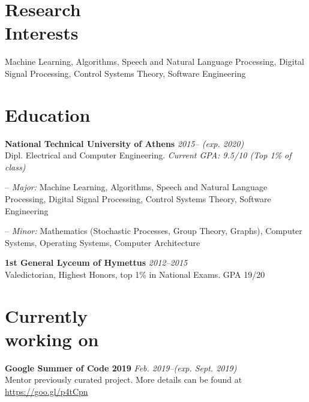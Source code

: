 \documentclass[margin]{res}
\newcommand{\field}[2]{\noindent \textbf{#1} \hfill #2 \\}
\begin{document}
\begin{resume}



\section{Research \\ Interests} Machine Learning, Algorithms, Speech and Natural Language Processing, Digital Signal Processing, Control Systems Theory, Software Engineering

\section{Education}
\textbf{National Technical University of Athens} \hfill \emph{2015-- (exp. 2020)} \\
Dipl. Electrical and Computer Engineering.  \hfill \emph{Current GPA: 9.5/10 (Top 1\% of class)} \\ 
\begin{compactitem}
\item[--] \emph{Major:} Machine Learning, Algorithms, Speech and Natural Language Processing, Digital Signal Processing, Control Systems Theory, Software Engineering \\
\item[--] \emph{Minor:} Mathematics (Stochastic Processes, Group Theory, Graphs), Computer Systems, Operating Systems, Computer Architecture 
\end{compactitem}


\textbf{1st General Lyceum of Hymettus} \hfill \emph{2012--2015} 
\\ Valedictorian, Highest Honors, top 1\% in National Exams. GPA 19/20



\section{Currently \\ working on}
\field{Google Summer of Code 2019} {\emph{Feb. 2019--(exp. Sept. 2019)}}
Mentor previously curated project. More details can be found at \url{https://goo.gl/p4tCpn}


\end{resume}
\end{document}
